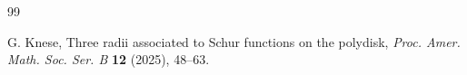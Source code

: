 \documentclass[a4paper,11pt, reqno]{amsart}
\theoremstyle{definition}
\begin{document}
\begin{thebibliography}{99}
	
	
	
	
	
	
	
	
	
	
	 {\sc G. Knese}, Three radii associated to Schur functions on the polydisk, {\it Proc. Amer. Math. Soc. Ser. B} {\bf 12} (2025), 48--63.
	

\end{thebibliography}
\end{document}
